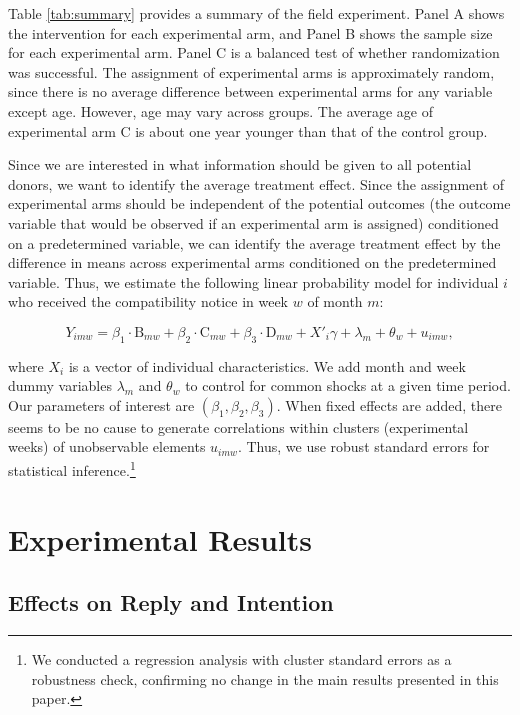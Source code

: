 \documentclass[
]{article}
\begin{document}
Table \ref{tab:summary} provides a summary of the field experiment. Panel A shows the intervention for each experimental arm, and Panel B shows the sample size for each experimental arm. Panel C is a balanced test of whether randomization was successful. The assignment of experimental arms is approximately random, since there is no average difference between experimental arms for any variable except age. However, age may vary across groups. The average age of experimental arm C is about one year younger than that of the control group.

Since we are interested in what information should be given to all potential donors, we want to identify the average treatment effect. Since the assignment of experimental arms should be independent of the potential outcomes (the outcome variable that would be observed if an experimental arm is assigned) conditioned on a predetermined variable, we can identify the average treatment effect by the difference in means across experimental arms conditioned on the predetermined variable. Thus, we estimate the following linear probability model for individual \(i\) who received the compatibility notice in week \(w\) of month \(m\):

\begin{equation}
  Y_{imw} =
  \beta_1 \cdot \text{B}_{mw} + \beta_2 \cdot \text{C}_{mw} + \beta_3 \cdot \text{D}_{mw}
  + X'_i \gamma + \lambda_m + \theta_w + u_{imw}, \label{eq:reg}
\end{equation}

where \(X_i\) is a vector of individual characteristics. We add month and week dummy variables \(\lambda_m\) and \(\theta_w\) to control for common shocks at a given time period. Our parameters of interest are \((\beta_1, \beta_2, \beta_3)\). When fixed effects are added, there seems to be no cause to generate correlations within clusters (experimental weeks) of unobservable elements \(u_{imw}\). Thus, we use robust standard errors for statistical inference.\footnote{We conducted a regression analysis with cluster standard errors as a robustness check, confirming no change in the main results presented in this paper.}

\hypertarget{result}{%
\section{Experimental Results}\label{result}}

\hypertarget{intention}{%
\subsection{Effects on Reply and Intention}\label{intention}}
\end{document}
